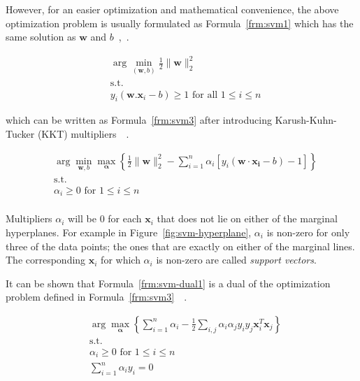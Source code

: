 However, for an easier optimization and mathematical convenience, the above optimization problem is usually formulated as Formula~\ref{frm:svm1} which has the same solution as $\mathbf{w}$ and $b$~\cite[Ch. 5]{thenatureofstatisticallearningtheory},~\cite[Ch. 7]{learning-with-kernels}.

\begin{align}
  &\arg\min_{(\mathbf{w},b)}\frac{1}{2}\|\mathbf{w}\|_2^2 \nonumber \\
  &\text{s.t.} \nonumber \\
  &y_i (\mathbf{w} . \mathbf{x}_i - b)\geq 1 \text{ for all } 1 \leq i \leq n
  \label{frm:svm1}
\end{align}

which can be written as Formula~\ref{frm:svm3} after introducing Karush-Kuhn-Tucker (KKT) multipliers~\cite{kkt-orig}~\cite[Ch. 5]{thenatureofstatisticallearningtheory}.

\begin{align}
  &\arg\min_{\mathbf{w},b } \max_{\boldsymbol{\alpha}} \left\{ \frac{1}{2}\|\mathbf{w}\|_2^2 - \sum_{i=1}^{n}{\alpha_i[y_i(\mathbf{w}\cdot \mathbf{x_i} - b)-1]} \right\} \nonumber \\
  &\text{s.t.} \nonumber \\
  &\alpha_i \geq 0 \text{ for } 1 \leq i \leq n \nonumber \\
  \label{frm:svm3}
\end{align}

Multipliers $\alpha_i$ will be $0$ for each $\mathbf{x}_i$ that does not lie on either of the marginal hyperplanes. For example in Figure~\ref{fig:svm-hyperplane}, $\alpha_i$ is non-zero for only three of the data points; the ones that are exactly on either of the marginal lines. The corresponding $\mathbf{x}_i$ for which $\alpha_i$ is non-zero are called \emph{support vectors}.

It can be shown that Formula~\ref{frm:svm-dual1} is a dual of the optimization problem defined in Formula~\ref{frm:svm3}~\cite[p. 14]{learning-with-kernels}~\cite[Ch. 5]{thenatureofstatisticallearningtheory}.

\begin{align}
  &\arg\max_{\boldsymbol{\alpha}}\left\{\sum_{i=1}^n \alpha_i - \frac{1}{2}\sum_{i, j} \alpha_i \alpha_j y_i y_j \mathbf{x}_i^T \mathbf{x}_j\right\} \nonumber \\
  &\text{s.t.} \nonumber \\
  &\alpha_i \geq 0 \text{ for } 1 \leq i \leq n \nonumber \\
  &\sum_{i=1}^{n}\alpha_i y_i = 0
  \label{frm:svm-dual1}
\end{align}

